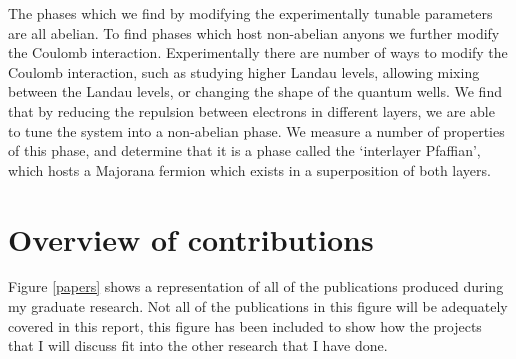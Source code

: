 The phases which we find by modifying the experimentally tunable parameters are all abelian. To find phases which host non-abelian anyons we further modify the Coulomb interaction. Experimentally there are number of ways to modify the Coulomb interaction, such as studying higher Landau levels, allowing mixing between the Landau levels, or changing the shape of the quantum wells. We find that by reducing the repulsion between electrons in different layers, we are able to tune the system into a non-abelian phase. We measure a number of properties of this phase, and determine that it is a phase called the `interlayer Pfaffian', which hosts a Majorana fermion which exists in a superposition of both layers.






\section{Overview of contributions}

Figure \ref{papers} shows a representation of all of the publications produced during my graduate research. Not all of the publications in this figure will be adequately covered in this report, this figure has been included to show how the projects that I will discuss fit into the other research that I have done. 

